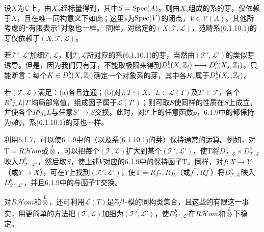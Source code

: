 设$X$为$\mathbb C$上，由$X_S$经标量得到，其中$S=\operatorname{Spec}(A)$。则由$X_s$组成的系的芽，仅依赖于$X$，且在唯一同构意义下如此；这里$s$为$\operatorname{Spec}(V)$的闭点，$V\in\mathcal V(A)$。其他所考虑的“有限表示”对象也一样。
同样，对给定的$(X,\mathcal T,\mathcal L)$，范畴系(6.1.10.1)的芽仅依赖于$(X,\mathcal T,\mathcal L)$。

若$\mathcal T',\mathcal L'$加细$\mathcal T,\mathcal L$，则$\mathcal T,\mathcal L$所对应的系(6.1.10.1)的芽，当然由$(\mathcal T',\mathcal L')$的类似芽诱导。但是，因为我们只有芽，不能取极限来得到$D_c^b(X,\mathbb Z_l)\longleftrightarrow D_c^b(X_s,\mathbb Z_l)$。只能断言：每个$K\in D_c^b(X,\mathbb Z_l)$确定一个对象系的芽，其中各$K_s$属于$D_c^b(X_s,\mathbb Z_l)$。

若$(\mathcal T,\mathcal L)$满足：(a)各且连通；(b)对$j:T\hookrightarrow X$、$L\in\mathcal L(T)$及$T'\in\mathcal T$，各个$R^qj_*L|T'$均局部常值，组成因子属于$\mathcal L(T')$；则可取$S$使同样的性质在$S$上成立，并使各个$R^qj_*L$与任意$S'\to S$交换。此时，对$\mathcal T$上的任意函数$p$，6.1.9中的都保持为$p$的，系(6.1.10.1)的芽也一样。

利用6.1.7，可以使6.1.9中的（以及系(6.1.10.1)的芽）保持通常的运算。例如，对$\mathrm T=R\mathcal Hom$或$\overset L\otimes$，可以把每个$(\mathcal T,\mathcal L)$扩大到某个$(\mathcal T',\mathcal L')$，使$\mathrm T$将$D_{\mathcal T,\mathcal L}^b\times D_{\mathcal T,\mathcal L}^b$映入$D_{\mathcal T',\mathcal L'}^b$，然后取$S$，使上述$V$对应的6.1.9中的保持函子$\mathrm T$。同样，对$f:X\to Y$（或$Y\to X$），可在$Y$上找到$(\mathcal T',\mathcal L')$，使$\mathrm T=Rf_*,Rf_!$（或$f^*,Rf^!$）将$D_{\mathcal T,\mathcal L}^b$映入$D_{\mathcal T',\mathcal L'}^b$，并且6.1.9中的与函子$\mathrm T$交换。

对$R\mathcal Hom$和$\overset L\otimes$，还可利用$\mathcal L(T)$是$\mathbb Z/l$-模的同构类集合，且这些的有限这一事实，用更简单的方法把$(\mathcal T,\mathcal L)$加细为$(\mathcal T',\mathcal L')$，使$D_{\mathcal T',\mathcal L'}^b$在$R\mathcal Hom$和$\overset L\otimes$下稳定。

